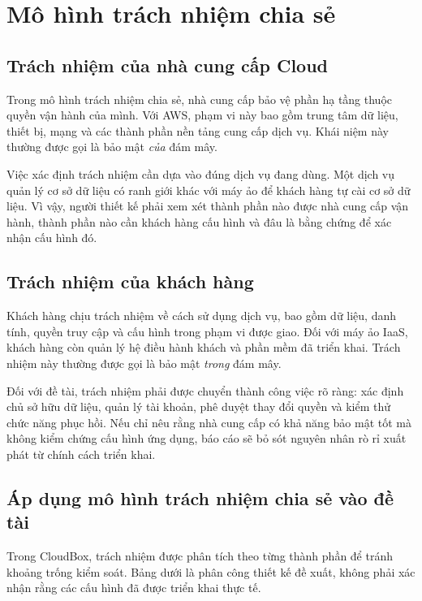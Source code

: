 \section{Mô hình trách nhiệm chia sẻ}
\subsection{Trách nhiệm của nhà cung cấp Cloud}
Trong mô hình trách nhiệm chia sẻ, nhà cung cấp bảo vệ phần hạ tầng thuộc quyền vận hành của mình. Với AWS, phạm vi này bao gồm trung tâm dữ liệu, thiết bị, mạng và các thành phần nền tảng cung cấp dịch vụ. Khái niệm này thường được gọi là bảo mật \textit{của} đám mây.\cite{shared}

Việc xác định trách nhiệm cần dựa vào đúng dịch vụ đang dùng. Một dịch vụ quản lý cơ sở dữ liệu có ranh giới khác với máy ảo để khách hàng tự cài cơ sở dữ liệu. Vì vậy, người thiết kế phải xem xét thành phần nào được nhà cung cấp vận hành, thành phần nào cần khách hàng cấu hình và đâu là bằng chứng để xác nhận cấu hình đó.

\subsection{Trách nhiệm của khách hàng}
Khách hàng chịu trách nhiệm về cách sử dụng dịch vụ, bao gồm dữ liệu, danh tính, quyền truy cập và cấu hình trong phạm vi được giao. Đối với máy ảo IaaS, khách hàng còn quản lý hệ điều hành khách và phần mềm đã triển khai. Trách nhiệm này thường được gọi là bảo mật \textit{trong} đám mây.\cite{shared}

Đối với đề tài, trách nhiệm phải được chuyển thành công việc rõ ràng: xác định chủ sở hữu dữ liệu, quản lý tài khoản, phê duyệt thay đổi quyền và kiểm thử chức năng phục hồi. Nếu chỉ nêu rằng nhà cung cấp có khả năng bảo mật tốt mà không kiểm chứng cấu hình ứng dụng, báo cáo sẽ bỏ sót nguyên nhân rò rỉ xuất phát từ chính cách triển khai.

\subsection{Áp dụng mô hình trách nhiệm chia sẻ vào đề tài}
Trong CloudBox, trách nhiệm được phân tích theo từng thành phần để tránh khoảng trống kiểm soát. Bảng dưới là phân công thiết kế đề xuất, không phải xác nhận rằng các cấu hình đã được triển khai thực tế.

